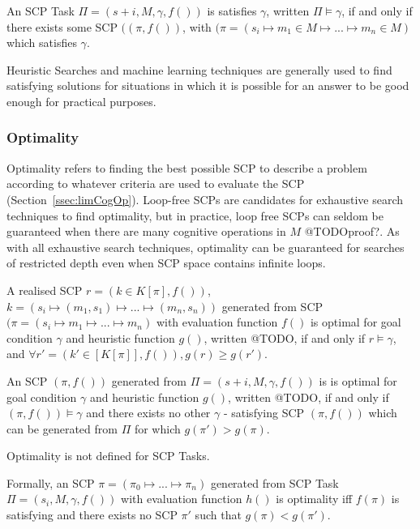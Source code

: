 An SCP Task $\Pi=(s+i, M, \gamma, f())$ is satisfies $\gamma$, written $\Pi\models \gamma$, if and only if there exists some SCP $((\pi,f())$, with $(\pi=(s_i \longmapsto m_1 \in M \longmapsto ... \longmapsto m_n \in M)$ which satisfies $\gamma$.

Heuristic Searches and machine learning techniques are generally used to find satisfying solutions for situations in which it is possible for an answer to be good enough for practical purposes. 

\subsubsection{Optimality}
Optimality refers to finding the best possible SCP to describe a problem according to whatever criteria are used to evaluate the SCP (Section~\ref{ssec:limCogOp}). Loop-free SCPs are candidates for exhaustive search techniques to find optimality, but in practice, loop free SCPs can seldom be guaranteed when there are many cognitive operations in $M$ @TODOproof?. As with all exhaustive search techniques, optimality can be guaranteed for searches of restricted depth even when SCP space contains infinite loops.

A realised SCP $r=(k \in K[\pi],f())$, $k=(s_i \longmapsto (m_1,s_1) \longmapsto ... \longmapsto (m_n,s_n))$ generated from SCP $(\pi=(s_i \longmapsto m_1 \longmapsto ... \longmapsto m_n)$ with evaluation function $f()$ is optimal for goal condition $\gamma$ and heuristic function $g()$, written @TODO, if and only if $r\models\gamma$, and $\forall r'=(k' \in [K[\pi]], f()), g(r)\geq g(r')$. 

An SCP $(\pi,f())$ generated from  $\Pi=(s+i, M, \gamma, f())$ is is optimal for goal condition $\gamma$ and heuristic function $g()$, written @TODO, if and only if $(\pi,f()) \models \gamma$ and there exists no other $\gamma$ - satisfying SCP $(\pi,f())$ which can be generated from $\Pi$ for which $g(\pi')>g(\pi)$.

Optimality is not defined for SCP Tasks.






Formally, an SCP $\pi=(\pi_0 \longmapsto ... \longmapsto \pi_n)$ generated from SCP Task $\Pi=(s_i, M, \gamma, f())$ with evaluation function $h()$ is optimality iff $f(\pi)$ is satisfying and there exists no SCP $\pi'$ such that $g(\pi)<g(\pi')$.

